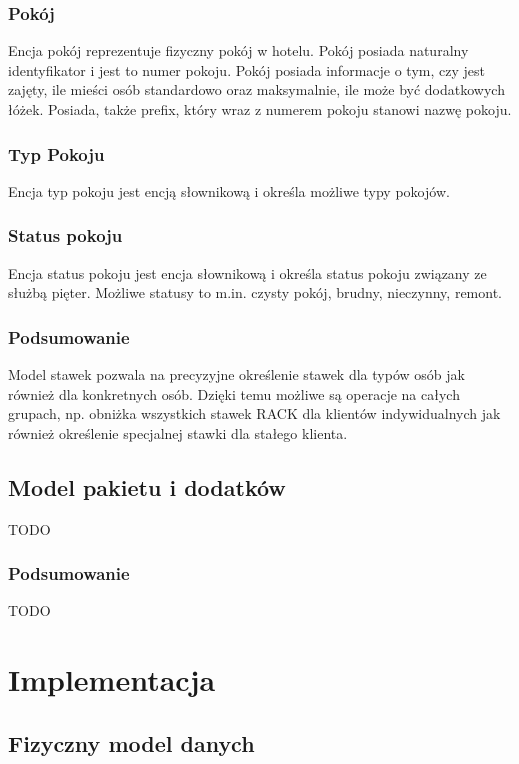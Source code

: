 \documentclass[a4paper,onecolumn,oneside,11pt,wide,floatssmall]{mwrep}
\theoremstyle{definition}
\theoremstyle{plain}%
\theoremstyle{remark}
\begin{document}
\subsection{Pokój}
Encja pokój reprezentuje fizyczny pokój w hotelu. Pokój posiada naturalny identyfikator i jest to numer pokoju. Pokój posiada informacje o tym, czy jest zajęty, ile mieści osób standardowo oraz maksymalnie, ile może być dodatkowych łóżek. Posiada, także prefix, który wraz z numerem pokoju stanowi nazwę pokoju.

\subsection{Typ Pokoju}
Encja typ pokoju jest encją słownikową i określa możliwe typy pokojów.

\subsection{Status pokoju}
Encja status pokoju jest encja słownikową i określa status pokoju związany ze służbą pięter. Możliwe statusy to m.in. czysty pokój, brudny, nieczynny, remont.

\subsection{Podsumowanie}
Model stawek pozwala na precyzyjne określenie stawek dla typów osób jak również dla konkretnych osób. Dzięki temu możliwe są operacje na całych grupach, np. obniżka wszystkich stawek RACK dla klientów indywidualnych jak również określenie specjalnej stawki dla stałego klienta.


\section{Model pakietu i dodatków}
TODO


\subsection{Podsumowanie}
TODO


\chapter{Implementacja}

\section{Fizyczny model danych}
\end{document}
